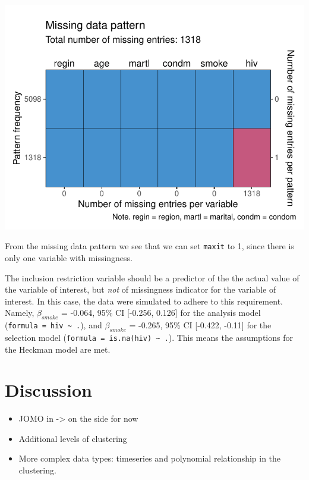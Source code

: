 \documentclass[
]{jss}
\begin{document}
\begin{CodeChunk}


\begin{center}\includegraphics{Manuscript_files/figure-latex/hiv-1} \end{center}

\end{CodeChunk}

From the missing data pattern we see that we can set \texttt{maxit} to
1, since there is only one variable with missingness.

The inclusion restriction variable should be a predictor of the the
actual value of the variable of interest, but \emph{not} of missingness
indicator for the variable of interest. In this case, the data were
simulated to adhere to this requirement. Namely, \(\beta_{smoke}\) =
-0.064, 95\% CI {[}-0.256, 0.126{]} for the analysis model
(\texttt{formula\ =\ hiv\ \textasciitilde{}\ .}), and \(\beta_{smoke}\)
= -0.265, 95\% CI {[}-0.422, -0.11{]} for the selection model
(\texttt{formula\ =\ is.na(hiv)\ \textasciitilde{}\ .}). This means the
assumptions for the Heckman model are met.

\hypertarget{discussion}{%
\section{Discussion}\label{discussion}}

\begin{itemize}
\item
  JOMO in  -\textgreater{} on the side for now
\item
  Additional levels of clustering
\item
  More complex data types: timeseries and polynomial relationship in the
  clustering.
\end{itemize}
\end{document}
